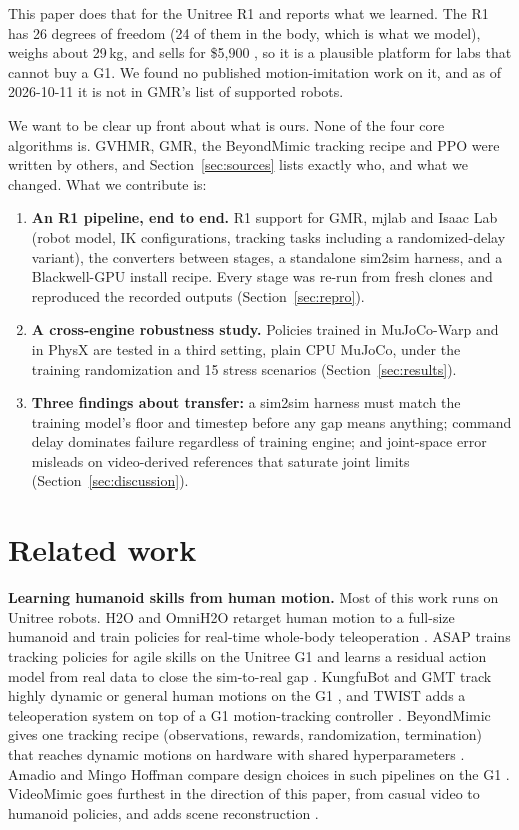 \documentclass[11pt]{article}
\begin{document}
This paper does that for the Unitree R1 and reports what we learned. The R1 has 26 degrees of freedom (24 of them in the body, which is what we model), weighs about 29\,kg, and sells for \$5,900 \cite{r1}, so it is a plausible platform for labs that cannot buy a G1. We found no published motion-imitation work on it, and as of 2026-10-11 it is not in GMR's list of supported robots.

We want to be clear up front about what is ours. None of the four core algorithms is. GVHMR, GMR, the BeyondMimic tracking recipe and PPO were written by others, and Section~\ref{sec:sources} lists exactly who, and what we changed. What we contribute is:
\begin{enumerate}
\item \textbf{An R1 pipeline, end to end.} R1 support for GMR, mjlab and Isaac Lab (robot model, IK configurations, tracking tasks including a randomized-delay variant), the converters between stages, a standalone sim2sim harness, and a Blackwell-GPU install recipe. Every stage was re-run from fresh clones and reproduced the recorded outputs (Section~\ref{sec:repro}).
\item \textbf{A cross-engine robustness study.} Policies trained in MuJoCo-Warp and in PhysX are tested in a third setting, plain CPU MuJoCo, under the training randomization and 15 stress scenarios (Section~\ref{sec:results}).
\item \textbf{Three findings about transfer:} a sim2sim harness must match the training model's floor and timestep before any gap means anything; command delay dominates failure regardless of training engine; and joint-space error misleads on video-derived references that saturate joint limits (Section~\ref{sec:discussion}).
\end{enumerate}

\section{Related work}
\textbf{Learning humanoid skills from human motion.} Most of this work runs on Unitree robots. H2O and OmniH2O retarget human motion to a full-size humanoid and train policies for real-time whole-body teleoperation \cite{h2o,omnih2o}. ASAP trains tracking policies for agile skills on the Unitree G1 and learns a residual action model from real data to close the sim-to-real gap \cite{asap}. KungfuBot and GMT track highly dynamic or general human motions on the G1 \cite{kungfubot,gmt}, and TWIST adds a teleoperation system on top of a G1 motion-tracking controller \cite{twist}. BeyondMimic gives one tracking recipe (observations, rewards, randomization, termination) that reaches dynamic motions on hardware with shared hyperparameters \cite{beyondmimic}. Amadio and Mingo Hoffman compare design choices in such pipelines on the G1 \cite{amadio}. VideoMimic goes furthest in the direction of this paper, from casual video to humanoid policies, and adds scene reconstruction \cite{videomimic}.
\end{document}

